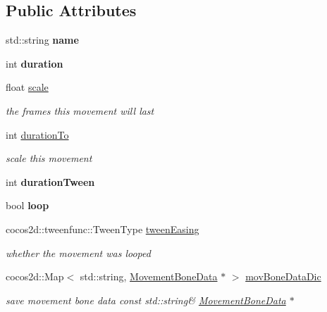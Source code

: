 \subsection*{Public Attributes}
\begin{DoxyCompactItemize}
\item 
\mbox{\label{classcocostudio_1_1MovementData_a01e5ef96cef534d34de940443496c8b3}} 
std\+::string {\bfseries name}
\item 
\mbox{\label{classcocostudio_1_1MovementData_a509fdebcf1fe443be4e0e3adbad73809}} 
int {\bfseries duration}
\item 
\mbox{\label{classcocostudio_1_1MovementData_a1638a81332d902d1b250c9403c30b20e}} 
float \hyperlink{classcocostudio_1_1MovementData_a1638a81332d902d1b250c9403c30b20e}{scale}
\begin{DoxyCompactList}\small\item\em the frames this movement will last \end{DoxyCompactList}\item 
int \hyperlink{classcocostudio_1_1MovementData_a6b188c6fc69665e926d67eb4abb3fdf6}{duration\+To}
\begin{DoxyCompactList}\small\item\em scale this movement \end{DoxyCompactList}\item 
\mbox{\label{classcocostudio_1_1MovementData_aa66f85c0fb5d93e6d3194d6862293beb}} 
int {\bfseries duration\+Tween}
\item 
\mbox{\label{classcocostudio_1_1MovementData_a91c61d57e95c6234f7a3a4c73eb7fbda}} 
bool {\bfseries loop}
\item 
cocos2d\+::tweenfunc\+::\+Tween\+Type \hyperlink{classcocostudio_1_1MovementData_a43031590e7c31eb38a39125842b27166}{tween\+Easing}
\begin{DoxyCompactList}\small\item\em whether the movement was looped \end{DoxyCompactList}\item 
\mbox{\label{classcocostudio_1_1MovementData_a51a7f0f00602855ef105fc04c31f9398}} 
cocos2d\+::\+Map$<$ std\+::string, \hyperlink{classcocostudio_1_1MovementBoneData}{Movement\+Bone\+Data} $\ast$ $>$ \hyperlink{classcocostudio_1_1MovementData_a51a7f0f00602855ef105fc04c31f9398}{mov\+Bone\+Data\+Dic}
\begin{DoxyCompactList}\small\item\em save movement bone data  const std\+::string\&  \hyperlink{classcocostudio_1_1MovementBoneData}{Movement\+Bone\+Data} $\ast$ \end{DoxyCompactList}\end{DoxyCompactItemize}


